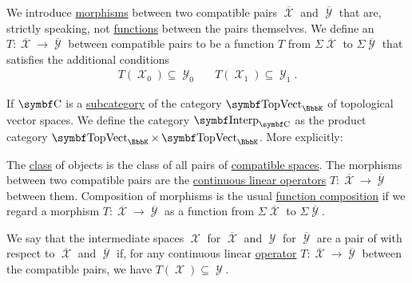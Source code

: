 \begin{definition}
\begin{DefEnum}
     We introduce \hyperref[def:category/C2]{morphisms} between two compatible pairs \( \overline{\mscrX} \) and \( \overline{\mscrY} \) that are, strictly speaking, not \hyperref[def:function]{functions} between the pairs themselves. We define an  \( T: \overline{\mscrX} \to \overline{\mscrY} \) between compatible pairs to be a function \( T \) from \( \Sigma \overline{\mscrX} \) to \( \Sigma \overline{\mscrY} \) that satisfies the additional conditions
    \begin{align*}
      T(\mscrX_0) \subseteq \mscrY_0
      &&
      T(\mscrX_1) \subseteq \mscrY_1.
    \end{align*}

     If \( \Cat{C} \) is a \hyperref[def:subcategory]{subcategory} of the category \hyperref[def:category_of_topological_vector_spaces]{\( \Cat{TopVect}_{\BbbK} \)} of topological vector spaces. We define the category \( \Cat{Interp}_{\Cat{C}} \) as the product category \( \Cat{TopVect}_{\BbbK} \times \Cat{TopVect}_{\BbbK} \). More explicitly:
    \begin{RefList}
       The \hyperref[def:set_zfc]{class} of objects is the class of all pairs of \hyperref[def:interpolated_topological_vector_space/compatibility]{compatible spaces}.
       The morphisms between two compatible pairs are the \hyperref[def:interpolated_topological_vector_space/morphisms]{continuous linear operators} \( T: \overline{\mscrX} \to \overline{\mscrY} \) between them.
       Composition of morphisms is the usual \hyperref[def:function/composition]{function composition} if we regard a morphism \( T: \overline{\mscrX} \to \overline{\mscrY} \) as a function from \( \Sigma \overline{\mscrX} \) to \( \Sigma \overline{\mscrY} \).
    \end{RefList}

     We say that the intermediate spaces \( \mscrX \) for \( \overline{\mscrX} \) and \( \mscrY \) for \( \overline{\mscrY} \) are a pair of  with respect to \( \overline{\mscrX} \) and \( \overline{\mscrY} \) if, for any continuous linear \hyperref[def:interpolated_topological_vector_space/morphisms]{operator} \( T: \overline{\mscrX} \to \overline{\mscrY} \) between the compatible pairs, we have \( T(\mscrX) \subseteq \mscrY \).
  \end{DefEnum}
\end{definition}

